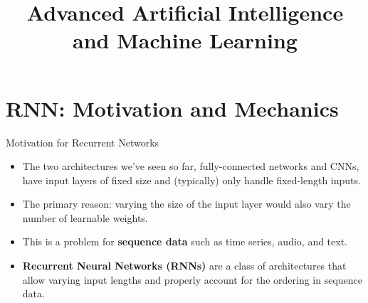 




\newcommand{\titlefigure}{figure/vae_faces.png}
\newcommand{\learninggoals}{
  \item RNNs as the sequence-processing counterpart to CNNs' spatial processing: parameter sharing across time, and backpropagation through time
  \item LSTM and GRU cells as fixes for the vanishing-gradient problem in vanilla RNNs
  \item RNN application patterns: language modeling, word embeddings, encoder-decoder (seq2seq) architectures
  \item Autoencoders as unsupervised feature learners: the undercomplete bottleneck, the connection to PCA, and regularized variants (sparse, denoising, contractive)
  \item Variational Autoencoders (VAEs) as probabilistic generative models: the ELBO objective and the reparameterization trick, at the concept level
}

\title{Advanced Artificial Intelligence and Machine Learning}
\date{}




\section{RNN: Motivation and Mechanics}

\begin{frame} {Motivation for Recurrent Networks}
  \begin{itemize}
    \item The two architectures we've seen so far, fully-connected networks and CNNs, have input layers of fixed size and (typically) only handle fixed-length inputs.
    \item The primary reason: varying the size of the input layer would also vary the number of learnable weights.
    \item This is a problem for \textbf{sequence data} such as time series, audio, and text.
    \item \textbf{Recurrent Neural Networks (RNNs)} are a class of architectures that allow varying input lengths and properly account for the ordering in sequence data.
  \end{itemize}
\end{frame}

